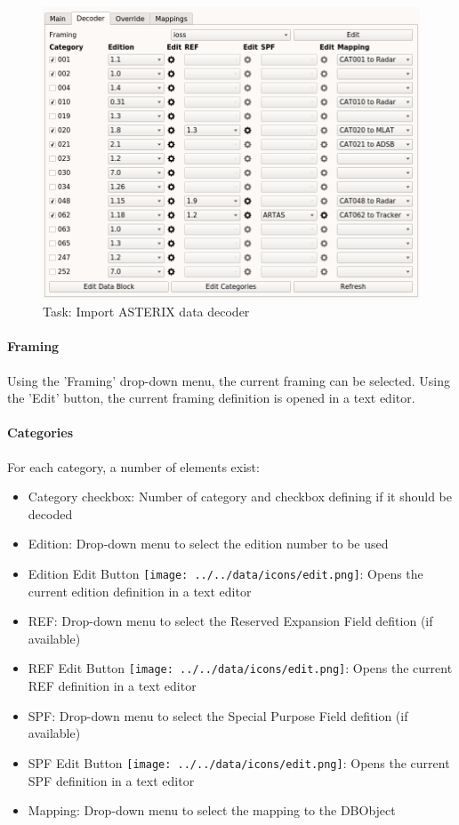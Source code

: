 \begin{figure}[H]
  \center
    \includegraphics[width=16cm,frame]{figures/asterix_import_data_decoder.png}
  \caption{Task: Import ASTERIX data decoder}
\end{figure}

\paragraph{Framing}
Using the 'Framing' drop-down menu, the current framing can be selected. Using the 'Edit' button, the current framing definition is opened in a text editor.

\paragraph{Categories}

For each category, a number of elements exist:

\begin{itemize}  
\item Category checkbox: Number of category and checkbox defining if it should be decoded
\item Edition: Drop-down menu to select the edition number to be used
\item Edition Edit Button \texttt{[image: ../../data/icons/edit.png]}: Opens the current edition definition in a text editor
\item REF: Drop-down menu to select the Reserved Expansion Field defition (if available)
\item REF Edit Button \texttt{[image: ../../data/icons/edit.png]}: Opens the current REF definition in a text editor
\item SPF: Drop-down menu to select the Special Purpose Field defition (if available)
\item SPF Edit Button \texttt{[image: ../../data/icons/edit.png]}: Opens the current SPF definition in a text editor
\item Mapping: Drop-down menu to select the mapping to the DBObject
\end{itemize}
\ \\

